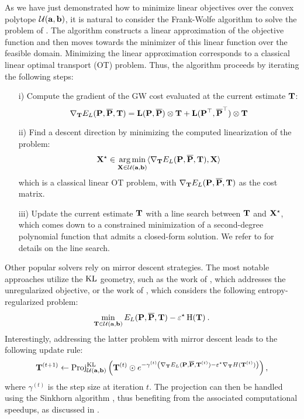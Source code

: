As we have just demonstrated how to minimize linear objectives over the convex polytope ${\mathcal{U}}({\mathbf{a}}, {\mathbf{b}})$, it is natural to consider the Frank-Wolfe algorithm \citep{frank1956algorithm} to solve the problem of . The algorithm constructs a linear approximation of the objective function and then moves towards the minimizer of this linear function over the feasible domain. Minimizing the linear approximation corresponds to a classical linear optimal transport (OT) problem. Thus, the algorithm proceeds by iterating the following steps:
\begin{enumerate}
    \item[i)] Compute the gradient of the GW cost evaluated at the current estimate ${\mathbf{T}}$:
    \[
        \nabla_{{\mathbf{T}}} E_L({\mathbf{P}}, \overline{{\mathbf{P}}}, {\mathbf{T}}) = {\mathbf{L}}({\mathbf{P}}, \overline{{\mathbf{P}}}) \otimes {\mathbf{T}} + {\mathbf{L}}({\mathbf{P}}^\top, \overline{{\mathbf{P}}}^\top) \otimes {\mathbf{T}}
    \]
    
    \item[ii)] Find a descent direction by minimizing the computed linearization of the problem:
    \[
    {\mathbf{X}}^\star \in \operatorname*{arg\,min}_{{\mathbf{X}} \in \mathcal{U}({\mathbf{a}}, {\mathbf{b}})} \langle \nabla_{{\mathbf{T}}} E_L({\mathbf{P}}, \overline{{\mathbf{P}}}, {\mathbf{T}}), {\mathbf{X}} \rangle
    \]
    which is a classical linear OT problem, with $\nabla_{{\mathbf{T}}} E_L({\mathbf{P}}, \overline{{\mathbf{P}}}, {\mathbf{T}})$ as the cost matrix.
    
    \item[iii)] Update the current estimate ${\mathbf{T}}$ with a line search between ${\mathbf{T}}$ and ${\mathbf{X}}^\star$, which comes down to a constrained minimization of a second-degree polynomial function that admits a closed-form solution. We refer to \citep{vayer2020contribution} for details on the line search.
\end{enumerate}

Other popular solvers rely on mirror descent strategies. The most notable approaches utilize the $\operatorname{KL}$ geometry, such as the work of \cite{xu2019gromov}, which addresses the unregularized  objective, or the work of \cite{peyre2016gromov}, which considers the following entropy-regularized problem:
\begin{align}
    \min_{{\mathbf{T}} \in {\mathcal{U}}({\mathbf{a}}, {\mathbf{b}})} E_L({\mathbf{P}}, \overline{{\mathbf{P}}}, {\mathbf{T}}) - \varepsilon^\star \operatorname{H}({\mathbf{T}}) \:.
\end{align}
Interestingly, addressing the latter problem with mirror descent leads to the following update rule:
\begin{align}
    {\mathbf{T}}^{(t+1)} \leftarrow \text{Proj}^{\operatorname{KL}}_{{\mathcal{U}}({\mathbf{a}}, {\mathbf{b}})} \left( {\mathbf{T}}^{(t)} \odot e^{-\gamma^{(t)} \left( \nabla_{{\mathbf{T}}} E_L({\mathbf{P}}, \overline{{\mathbf{P}}}, {\mathbf{T}}^{(t)}) - \varepsilon^\star \nabla_{{\mathbf{T}}} H({\mathbf{T}}^{(t)}) \right)} \right),
\end{align}
where $\gamma^{(t)}$ is the step size at iteration $t$. The projection can then be handled using the Sinkhorn algorithm \citep{cuturi2013sinkhorn}, thus benefiting from the associated computational speedups, as discussed in .


